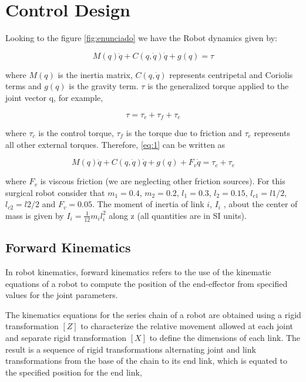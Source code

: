 \section{Control Design}

Looking to the figure \ref{fig:enunciado} we have the Robot dynamics given by:

\begin{equation}
    M(q)\ddot{q} + C(q,\dot{q})\dot{q} + g(q) = \tau
    \label{eq:1}
\end{equation}

where $M(q)$ is the inertia matrix, $C(q, \dot{q})$ represents centripetal and Coriolis terms
and $g(q)$ is the gravity term. $\tau$ is the generalized torque applied to the joint
vector q, for example,

\begin{equation}
    \tau = \tau_c + \tau_f + \tau_e
    \label{eq:2}
\end{equation}

where $\tau_c$
is the control torque, $\tau_f$ is the torque due to friction and $\tau_e$ represents all
other external torques. Therefore, \eqref{eq:1} can be written as

\begin{equation}
     M(q)\ddot{q} + C(q,\dot{q})\dot{q} + g(q) + F_v\dot{q} = \tau_c + \tau_e
     \label{eq:3}
\end{equation}

where $F_v$ is viscous friction (we are neglecting other friction sources). For this
surgical robot consider that $m_1 = 0.4$, $m_2 = 0.2$, $l_1 = 0.3$, $l_2 = 0.15$, $l_{c1} = l1/2$, $l_{c2} = l2/2$ and $F_v = 0.05$. The moment of inertia of link $i$, $I_i$
, about the center of
mass is given by $I_i = \frac{1}{12}m_il_i^2$
along z (all quantities are in SI units).

\subsection{Forward Kinematics}

In robot kinematics, forward kinematics refers to the use of the kinematic equations of a robot to compute the position of the end-effector from specified values for the joint parameters.

The kinematics equations for the series chain of a robot are obtained using a rigid transformation $[Z]$ to characterize the relative movement allowed at each joint and separate rigid transformation $[X]$ to define the dimensions of each link. The result is a sequence of rigid transformations alternating joint and link transformations from the base of the chain to its end link, which is equated to the specified position for the end link,

